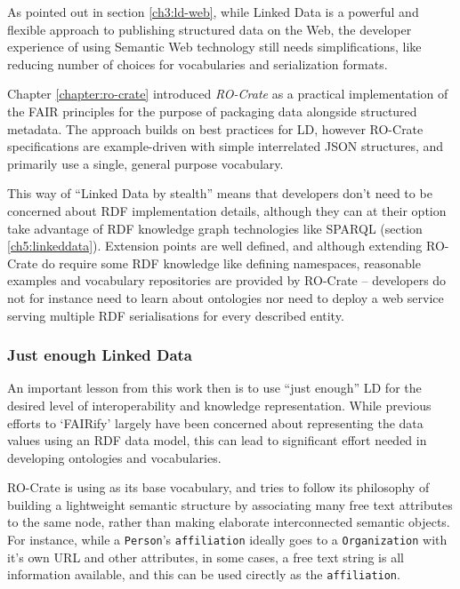 As pointed out in section \vref{ch3:ld-web}, while Linked Data is a powerful and flexible approach to publishing structured data on the Web, the developer experience of using Semantic Web technology still needs simplifications, like reducing number of choices for vocabularies and serialization formats. 

Chapter \vref{chapter:ro-crate} introduced \emph{RO-Crate} as a practical implementation of the FAIR principles for the purpose of packaging data alongside structured metadata.
The approach builds on best practices for 
\acrlong{LD},
however \acrshort{RO-Crate} specifications are example-driven with simple interrelated \acrshort{JSON} structures, and primarily use a single, general purpose vocabulary. 

This way of ``Linked Data by stealth'' means that developers don't need to be concerned about RDF implementation details, although they can at their option take advantage of RDF knowledge graph technologies like SPARQL (section \vref{ch5:linkeddata}).
Extension points are well defined, and although extending RO-Crate do require some \acrshort{RDF} knowledge like defining namespaces, reasonable examples and vocabulary repositories are provided by RO-Crate --  developers do not for instance need to learn about ontologies nor need to deploy a web service serving multiple RDF serialisations for every described entity.



\subsubsection{Just enough Linked Data}
\label{ch61:justenough}

An important lesson from this work then is to use ``just enough'' \acrlong{LD} for the desired level of interoperability and knowledge representation.
While previous efforts to `FAIRify' largely have been concerned about representing the data values using an \acrshort{RDF} data model, this can lead to significant effort needed in developing ontologies and vocabularies. 

RO-Crate is using \cite{schema.org} as its base vocabulary, and tries to follow its philosophy of building a lightweight semantic structure by associating many free text attributes to the same node, rather than making elaborate interconnected semantic objects.
For instance, while a \texttt{Person}'s \texttt{affiliation} ideally goes to a \texttt{Organization} with it's own \acrshort{URL} and other attributes, in some cases, a free text string is all information available, and this can be used cirectly as the \texttt{affiliation}. 

